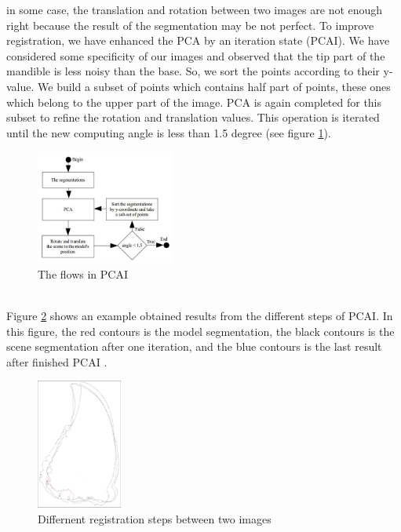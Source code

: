 \documentclass[twoside,twocolumn,10pt]{article}
\begin{document}
in some case, the translation and rotation between two images are
not enough right because the result of the segmentation may be not perfect. To improve registration, we have enhanced the PCA by an iteration state (PCAI). We have considered some specificity of our images and observed that the tip part of the mandible is less noisy than the base. So, we sort the points according to their y-value. We build a subset of points which contains half part of points, these ones which belong to the upper part of the image. PCA is again completed for this subset to refine the rotation and translation values. This operation is iterated until the new computing angle is less than 1.5 degree (see figure \ref{fig:pcai}).
\begin{figure}[htb]
    \centering
    \includegraphics[width=0.4\textwidth]{./images/pcadiagram}
    \caption{The flows in PCAI}
    \label{fig:pcai}
\end{figure}~\\
Figure \ref{fig:box} shows an example obtained results from the different steps of PCAI. In this figure, the red contours is the model segmentation, the black contours is the scene segmentation after one iteration, and the blue contours is the last result after finished PCAI .\\

\begin{figure}[htb]
    \centering
    \includegraphics[width=0.25\textwidth]{./images/imreg}
    \caption{Differnent registration steps between two images}
    \label{fig:box}
\end{figure}
\end{document}
